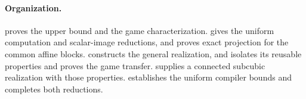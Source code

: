 \paragraph{Organization.}
 proves the upper bound and the game characterization.
 gives the uniform computation and scalar-image
reductions, and  proves exact projection for the
common affine blocks.  constructs the general
realization, and  isolates its reusable properties
and proves the game transfer.  supplies a connected
subcubic realization with those properties. 
establishes the uniform compiler bounds and completes both reductions.
